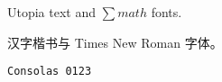 \documentclass[UTF8]{ctexart}
\begin{document}
Utopia text and $\sum math$ fonts.

汉字楷书与 {\timesnew Times New Roman} 字体。

\texttt{Consolas 0123}
\end{document}
